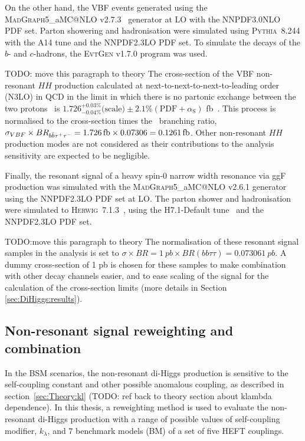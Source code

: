 On the other hand, the VBF events generated using the
\textsc{MadGraph}5\_aMC@NLO v2.7.3~\cite{Alwall:2014hca} generator at LO 
with the \textsc{NNPDF3.0NLO}~\cite{Ball:2014uwa} PDF set.
Parton showering and hadronisation were simulated using \textsc{Pythia~8.244}
with the A14 tune and the \textsc{NNPDF2.3LO} PDF set.
To simulate the decays of the $b$- and $c$-hadrons,
the \textsc{EvtGen} v1.7.0 program was used.

TODO: move this paragraph to theory
The cross-section of the VBF non-resonant $HH$ production calculated at
next-to-next-to-next-to-leading order (N3LO) in QCD in the limit 
in which there is no partonic exchange between the two protons~\cite{Dreyer:2018qbw} is
$1.726^{+0.03\%}_{-0.04\%}\text{(scale)}\pm 2.1\%(\text{PDF}+\alpha_\text{S})$ fb~\cite{dihiggs-twiki}.
This process is normalised to the cross-section times the \bbtautau\ branching ratio, \linebreak[2]
\mbox{$\sigma_{VBF} \times BR_{b\bar{b}\tau^{+}\tau^{-}}  = \SI{1.726}{fb} \times 0.07306  =  \SI{0.1261}{fb}$.}  
Other non-resonant $HH$ production modes are not considered as their contributions
to the analysis sensitivity are expected to be negligible.



Finally, the resonant signal  
of a heavy spin-0 narrow width resonance via ggF production 
was simulated with the \textsc{MadGraph}5\_aMC@NLO v2.6.1 
generator using the \textsc{NNPDF2.3LO} PDF
set at LO.
The parton shower and hadronisation were simulated to
\textsc{Herwig~7.1.3}~\cite{Bahr:2008pv,Bellm:2015jjp},
using the H7.1-Default tune~\cite{Gieseke:2012ft}
and the \textsc{NNPDF2.3LO} PDF set.


TODO:move this paragraph to theory
The normalisation of these resonant signal samples in the analysis is set to \linebreak[2]
\mbox{$\sigma \times BR  = \SI{1}{pb} \times BR (bb \tau \tau)  =  0.07306 \SI{1}{pb}$.} 
A dummy cross-section of 1 pb is chosen for these samples 
to make combination with other decay channels easier, 
and to ease scaling of the signal 
for the calculation of the cross-section limits 
(more details in Section \ref{sec:DiHiggs:results}).

\subsection{Non-resonant signal reweighting and combination}
\label{sec:DiHiggs:klscan}
In the BSM scenarios, the non-resonant di-Higgs production is sensitive 
to the self-coupling constant and other possible anomalous coupling,
as described in section~\ref{sec:Theory:kl} 
(TODO: ref back to theory section about klambda dependence).
In this thesis, a reweighting method is used to evaluate
the non-resonant di-Higgs production with a range of possible 
values of self-coupling modifier, $k_\lambda$, and 7 benchmark models (BM)
of a set of five HEFT couplings. 
